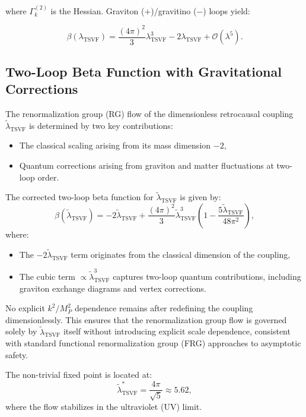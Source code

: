 \documentclass[twocolumn,superscriptaddress,floatfix]{revtex4-2}
\begin{document}
where $\Gamma_k^{(2)}$ is the Hessian. Graviton ($+$)/gravitino ($-$) loops yield:  

\begin{equation}  
\beta(\lambda_{\text{TSVF}}) = \frac{(4\pi)^2}{3}\lambda_{\text{TSVF}}^3 - 2\lambda_{\text{TSVF}} + \mathcal{O}(\lambda^5).  
\end{equation}  


\subsection{Two-Loop Beta Function with Gravitational Corrections}
\label{sec:twoloopbeta}

The renormalization group (RG) flow of the dimensionless retrocausal coupling \(\tilde{\lambda}_{\text{TSVF}}\) is determined by two key contributions:
\begin{itemize}
    \item The classical scaling arising from its mass dimension \(-2\),
    \item Quantum corrections arising from graviton and matter fluctuations at two-loop order.
\end{itemize}

The corrected two-loop beta function for \(\tilde{\lambda}_{\text{TSVF}}\) is given by:
\begin{equation}
\beta(\tilde{\lambda}_{\text{TSVF}}) = -2\tilde{\lambda}_{\text{TSVF}} + \frac{(4\pi)^2}{3} \tilde{\lambda}_{\text{TSVF}}^3 \left( 1 - \frac{5\tilde{\lambda}_{\text{TSVF}}}{48\pi^2} \right),
\end{equation}
where:
\begin{itemize}
    \item The \(-2\tilde{\lambda}_{\text{TSVF}}\) term originates from the classical dimension of the coupling,
    \item The cubic term \(\propto \tilde{\lambda}_{\text{TSVF}}^3\) captures two-loop quantum contributions, including graviton exchange diagrams and vertex corrections.
\end{itemize}

No explicit \(k^2/M_P^2\) dependence remains after redefining the coupling dimensionlessly. This ensures that the renormalization group flow is governed solely by \(\tilde{\lambda}_{\text{TSVF}}\) itself without introducing explicit scale dependence, consistent with standard functional renormalization group (FRG) approaches to asymptotic safety.

The non-trivial fixed point is located at:
\begin{equation}
\tilde{\lambda}_{\text{TSVF}}^* = \frac{4\pi}{\sqrt{5}} \approx 5.62,
\end{equation}
where the flow stabilizes in the ultraviolet (UV) limit.
\end{document}
